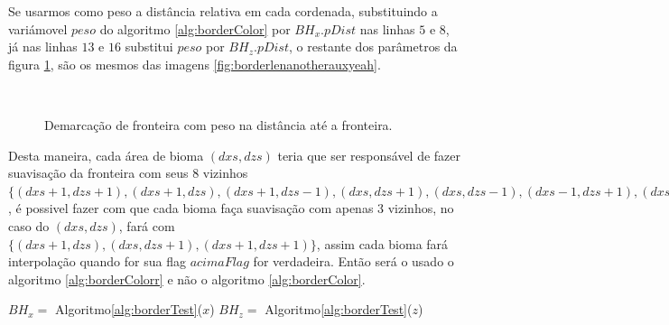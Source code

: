 Se usarmos como peso a distância relativa em cada cordenada, substituindo a variámovel
$peso$ do algoritmo \ref{alg:borderColor} por $BH_{x}.pDist$ nas linhas $5$ e $8$, já
nas linhas $13$ e $16$ substitui $peso$ por $BH_{z}.pDist$, o restante dos parâmetros
da figura \ref{fig:borderlenanotherauxyeahp}, são os mesmos das imagens \ref{fig:borderlenanotherauxyeah}.

\begin{figure}[H]
     \centering
     \hspace{0.1cm}
     \\
     \caption{Demarcação de fronteira com peso na distância até a fronteira.}
     
     \label{fig:borderlenanotherauxyeahp}
\end{figure}

Desta maneira, cada área de bioma $(dxs, dzs)$ teria que ser responsável de fazer suavisação da 
fronteira com seus $8$ vizinhos 
$\{(dxs+1, dzs+1), (dxs+1, dzs), (dxs+1, dzs-1), (dxs, dzs+1), (dxs, dzs-1), (dxs-1, dzs+1), (dxs-1, dzs), (dxs-1, dzs-1)\}$
, é possivel fazer com que cada bioma faça suavisação com apenas 3 vizinhos, no caso do 
$(dxs, dzs)$, fará com $\{(dxs+1, dzs), (dxs, dzs+1), (dxs+1, dzs+1)\}$, assim cada 
bioma fará interpolação quando for sua flag $acimaFlag$ for verdadeira. Então
será o usado o algoritmo \ref{alg:borderColorr} e não o algoritmo \ref{alg:borderColor}.

\begin{algorithm}[H]\label{alg:borderColorr}%
    $BH_{x} =$ Algoritmo\ref{alg:borderTest}($x$)\;
    $BH_{z} =$ Algoritmo\ref{alg:borderTest}($z$)\;
    
    
    \caption{Colorindo fronteira apenas acima.}
\end{algorithm}

